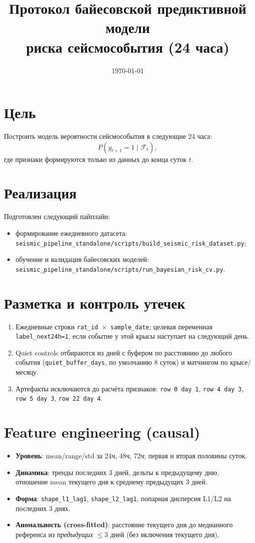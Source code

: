 \documentclass[11pt,a4paper]{article}
\title{Протокол байесовской предиктивной модели\\риска сейсмособытия (24 часа)}
\author{}
\date{\today}
\begin{document}
\maketitle

\section{Цель}
Построить модель вероятности сейсмособытия в следующие 24 часа:
\[
P(y_{t+1}=1 \mid \mathcal{F}_t),
\]
где признаки формируются только из данных до конца суток $t$.

\section{Реализация}
Подготовлен следующий пайплайн:
\begin{itemize}
  \item формирование ежедневного датасета:
  \texttt{seismic\_pipeline\_standalone/scripts/build\_seismic\_risk\_dataset.py};
  \item обучение и валидация байесовских моделей:
  \texttt{seismic\_pipeline\_standalone/scripts/run\_bayesian\_risk\_cv.py}.
\end{itemize}

\section{Разметка и контроль утечек}
\begin{enumerate}
  \item Ежедневные строки \texttt{rat\_id $\times$ sample\_date}; целевая
  переменная \texttt{label\_next24h=1}, если событие у этой крысы наступает
  на следующий день.
  \item Quiet controls отбираются из дней с буфером по расстоянию до любого
  события (\texttt{quiet\_buffer\_days}, по умолчанию 8 суток) и матчингом по
  крысе/месяцу.
  \item Артефакты исключаются до расчёта признаков:
  \texttt{row 0 day 1}, \texttt{row 4 day 3}, \texttt{row 5 day 3},
  \texttt{row 22 day 4}.
\end{enumerate}

\section{Feature engineering (causal)}
\begin{itemize}
  \item \textbf{Уровень}: mean/range/std за 24ч, 48ч, 72ч; первая и вторая
  половины суток.
  \item \textbf{Динамика}: тренды последних 3 дней, дельты к предыдущему дню,
  отношение mean текущего дня к среднему предыдущих 3 дней.
  \item \textbf{Форма}: \texttt{shape\_l1\_lag1}, \texttt{shape\_l2\_lag1},
  попарная дисперсия L1/L2 на последних 3 днях.
  \item \textbf{Аномальность (cross-fitted)}: расстояние текущего дня до
  медианного референса из \emph{предыдущих} $\le 3$ дней (без включения
  текущего дня).
\end{itemize}
\end{document}
